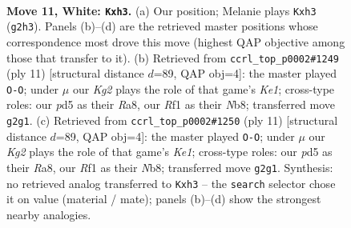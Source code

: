 \documentclass[11pt]{article}
\begin{document}
\clearpage

\begin{figure}[p]\centering
\begin{subfigure}{0.46\textwidth}\centering
\resizebox{\linewidth}{!}{%
\newchessgame
\chessboard[
  setfen={rn1q1rk1/1p2bpp1/5n2/p1pp3p/8/1P2PNPb/P2P1PKP/RNBQ1R2 w - - 0 11},
  showmover=false,
  pgfstyle=straightmove, color=movearrow, markmove={g2-h3}
]}
\caption{}
\end{subfigure}\hfill
\begin{subfigure}{0.46\textwidth}\centering
\resizebox{\linewidth}{!}{%
\newchessgame
\chessboard[
  setfen={rn1qk2r/pbppppbp/1p3np1/8/2PP4/5NP1/PP2PPBP/RNBQ1RK1 b kq - 3 6},
  showmover=false,
  pgfstyle=straightmove, color=movearrow, markmove={e8-g8}
]}
\caption{}
\end{subfigure}
\\[4pt]
\begin{subfigure}{0.46\textwidth}\centering
\resizebox{\linewidth}{!}{%
\newchessgame
\chessboard[
  setfen={rn1qk2r/pbppppbp/1p3np1/8/2PP4/5NP1/PP2PPBP/RNBQ1RK1 b kq - 3 6},
  showmover=false,
  pgfstyle=straightmove, color=movearrow, markmove={e8-g8}
]}
\caption{}
\end{subfigure}\hfill

\caption{\textbf{Move 11, White: \texttt{Kxh3}.} (a) Our position; Melanie plays \texttt{Kxh3} (\texttt{g2h3}). Panels (b)--(d) are the retrieved master positions whose correspondence most drove this move (highest QAP objective among those that transfer to it). (b) Retrieved from \texttt{ccrl\_top\_p0002\#1249} (ply 11) [structural distance $d$=89, QAP obj=4]: the master played \texttt{O-O}; under $\mu$ our \emph{Kg2} plays the role of that game's \emph{Ke1}; cross-type roles: our \emph{p}d5 as their \emph{R}a8, our \emph{R}f1 as their \emph{N}b8; transferred move \texttt{g2g1}. (c) Retrieved from \texttt{ccrl\_top\_p0002\#1250} (ply 11) [structural distance $d$=89, QAP obj=4]: the master played \texttt{O-O}; under $\mu$ our \emph{Kg2} plays the role of that game's \emph{Ke1}; cross-type roles: our \emph{p}d5 as their \emph{R}a8, our \emph{R}f1 as their \emph{N}b8; transferred move \texttt{g2g1}. Synthesis: no retrieved analog transferred to \texttt{Kxh3} -- the \texttt{search} selector chose it on value (material / mate); panels (b)--(d) show the strongest nearby analogies.}
\label{fig:thought-m20}
\end{figure}

\clearpage
\end{document}
